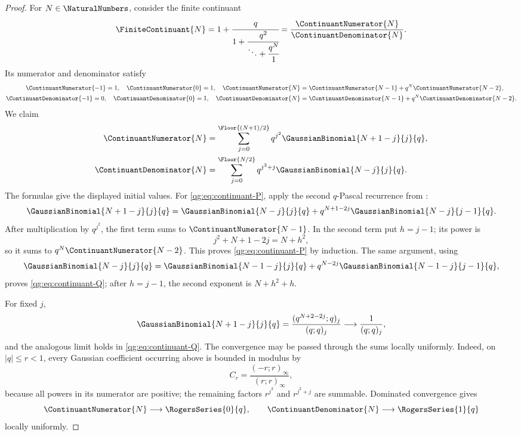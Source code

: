 \begin{proof}
For \(N\in\NaturalNumbers\), consider the finite continuant
\[
 \FiniteContinuant{N}
 =1+\cfrac{q}{
  1+\cfrac{q^2}{
  \ddots+\cfrac{q^N}{1}}}
 =\frac{\ContinuantNumerator{N}}{\ContinuantDenominator{N}}.
\]
Its numerator and denominator satisfy
\begin{align*}
 \ContinuantNumerator{-1}=1,\quad \ContinuantNumerator{0}=1,\quad
 \ContinuantNumerator{N}
 &=\ContinuantNumerator{N-1}+q^N\ContinuantNumerator{N-2},\\
 \ContinuantDenominator{-1}=0,\quad \ContinuantDenominator{0}=1,\quad
 \ContinuantDenominator{N}
 &=\ContinuantDenominator{N-1}+q^N\ContinuantDenominator{N-2}.
\end{align*}
We claim
\begin{align}
 \ContinuantNumerator{N}
 &=\sum_{j=0}^{\Floor{(N+1)/2}}
   q^{j^2}\GaussianBinomial{N+1-j}{j}{q},
 \label{qg:eq:continuant-P}\\
 \ContinuantDenominator{N}
 &=\sum_{j=0}^{\Floor{N/2}}
   q^{j^2+j}\GaussianBinomial{N-j}{j}{q}.
 \label{qg:eq:continuant-Q}
\end{align}
The formulas give the displayed initial values.  For
\eqref{qg:eq:continuant-P}, apply the second \(q\)-Pascal recurrence
from :
\[
 \GaussianBinomial{N+1-j}{j}{q}
 =
 \GaussianBinomial{N-j}{j}{q}
 +q^{N+1-2j}\GaussianBinomial{N-j}{j-1}{q}.
\]
After multiplication by \(q^{j^2}\), the first term sums to
\(\ContinuantNumerator{N-1}\).  In the second term put \(h=j-1\); its power is
\[
 j^2+N+1-2j=N+h^2,
\]
so it sums to \(q^N\ContinuantNumerator{N-2}\).  This proves
\eqref{qg:eq:continuant-P} by induction.  The same argument, using
\[
 \GaussianBinomial{N-j}{j}{q}
 =
 \GaussianBinomial{N-1-j}{j}{q}
 +q^{N-2j}\GaussianBinomial{N-1-j}{j-1}{q},
\]
proves \eqref{qg:eq:continuant-Q}; after \(h=j-1\), the second
exponent is \(N+h^2+h\).

For fixed \(j\),
\[
 \GaussianBinomial{N+1-j}{j}{q}
 =\frac{(q^{N+2-2j};q)_j}{(q;q)_j}
 \longrightarrow\frac1{(q;q)_j},
\]
and the analogous limit holds in
\eqref{qg:eq:continuant-Q}.  The convergence may be passed through
the sums locally uniformly.  Indeed, on \(|q|\le r<1\), every Gaussian
coefficient occurring above is bounded in modulus by
\[
 C_r=\frac{(-r;r)_\infty}{(r;r)_\infty},
\]
because all powers in its numerator are positive; the remaining factors
\(r^{j^2}\) and \(r^{j^2+j}\) are summable.  Dominated convergence gives
\[
  \ContinuantNumerator{N}\longrightarrow\RogersSeries{0}{q},
  \qquad
  \ContinuantDenominator{N}\longrightarrow\RogersSeries{1}{q}
\]
locally uniformly.


\end{proof}
